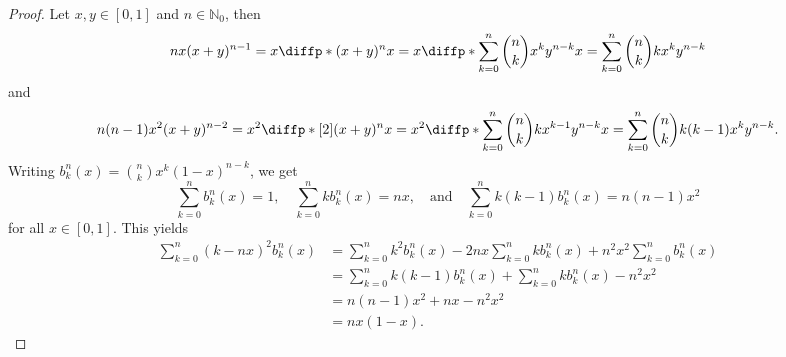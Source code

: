 \begin{proof}
    Let \(x, y \in [0,1]\) and \(n \in \mathbb{N}_0\), then
    \begin{equation*}
        nx(x + y)^{n-1} = x\diffp*{(x + y)^n}{x} = x\diffp*{\sum_{k = 0}^n\binom{n}{k} x^k y^{n-k}}{x} = \sum_{k=0}^n \binom{n}{k} k x^{k}y^{n - k}
    \end{equation*}
    and
    \begin{equation*}
        n(n-1)x^2(x + y)^{n-2} = x^2\diffp*[2]{(x + y)^n}{x} = x^2\diffp*{ \sum_{k=0}^n \binom{n}{k} k x^{k-1}y^{n - k}}{x} =  \sum_{k = 0}^n \binom{n}{k} k (k-1) x^{k} y^{n - k}.
    \end{equation*}
    Writing \(b^n_k(x) = \binom{n}{k} x^k (1 - x)^{n - k}\), we get
    \begin{equation*}
        \sum_{k = 0}^n b^n_k(x) = 1,
        \quad
        \sum_{k=0}^n k b^n_k(x) = n x,
        \quad\text{and}\quad
        \sum_{k=0}^n k(k-1) b^n_k(x) = n(n-1)x^2
    \end{equation*}
    for all \(x \in [0,1]\). This yields
    \begin{align*}
        \sum_{k = 0}^n (k - nx)^2 b^n_k(x) &= \sum_{k = 0}^n k^2 b^n_k(x) - 2nx\sum_{k=0}^n kb^n_k(x) + n^2 x^2 \sum_{k = 0}^n b^n_k(x)\\
                                           &= \sum_{k = 0}^n k(k-1) b^n_k(x) + \sum_{k=0}^n k b^n_k(x) - n^2 x^2 \\
                                           &= n(n-1)x^2 + nx - n^2x^2\\
                                           &= nx(1 - x).
    \end{align*}


\end{proof}
